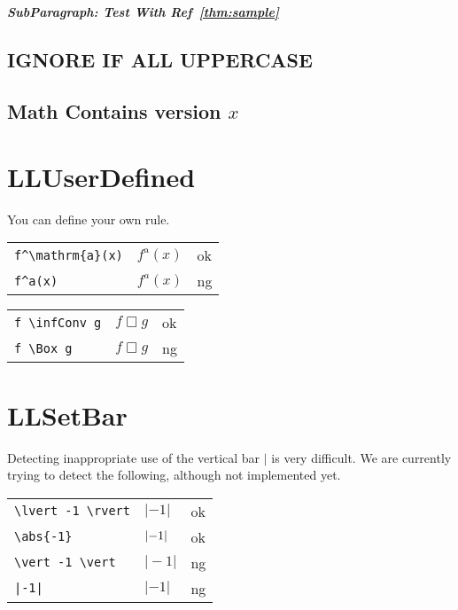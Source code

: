 \documentclass[a4paper]{article}
\newcommand{\tA}[1]{\textcolor{cA}{#1}}
\newcommand{\tD}[1]{\textcolor{cD}{#1}}
\DeclareMathOperator{\infConv}{\Box}
\begin{document}
\subparagraph{SubParagraph: Test With Ref~\ref{thm:sample}}

\subsection{IGNORE IF ALL UPPERCASE}

\subsection{Math Contains version $x$}

\section{LLUserDefined}

You can define your own rule.

\begin{table}[H]
	\centering
	\begin{tabular}{lll}
		\verb|f^\mathrm{a}(x)| & $f^{\mathrm{a}}(x)$ & \tA{ok} \\
		\verb|f^a(x)|          & $f^a(x)$            & \tD{ng} \\
	\end{tabular}
\end{table}

\begin{table}[H]
	\centering
	\begin{tabular}{lll}
		\verb|f \infConv g| & $f \infConv g$ & \tA{ok} \\
		\verb|f \Box g|     & $f \Box g$     & \tD{ng} \\
	\end{tabular}
\end{table}

\newpage
\appendix

\renewcommand\thesection{Appendix \Alph{section}}

\section{LLSetBar}

Detecting inappropriate use of the vertical bar $|$ is very difficult.
We are currently trying to detect the following, although not implemented yet.

\begin{table}[H]
	\centering
	\begin{tabular}{lll}
		\verb#\lvert -1 \rvert# & $\lvert -1 \rvert$ & \tA{ok} \\
		\verb#\abs{-1}#         & $\abs{-1}$         & \tA{ok} \\
		\verb#\vert -1 \vert#   & $\vert -1 \vert$   & \tD{ng} \\
		\verb#|-1|#             & $|-1|$             & \tD{ng} \\
	\end{tabular}
\end{table}
\end{document}
